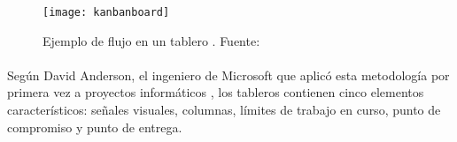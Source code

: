 \documentclass{subfiles}
\begin{document}
        \begin{figure}
        \centering
        \texttt{[image: kanbanboard]}
        \caption[Ejemplo de flujo en un tablero \Kanban]{Ejemplo de flujo en un tablero \Kanban. Fuente: }
        \label{fig:kanbanboard}
        \end{figure}

        \paragraph{}
        {Según David Anderson, el ingeniero de Microsoft que aplicó esta metodología por primera vez a proyectos informáticos \cite{book:anderson_david_kanban}, los tableros \Kanban contienen cinco elementos característicos: señales visuales, columnas, límites de trabajo en curso, punto de compromiso y punto de entrega.}
\end{document}
